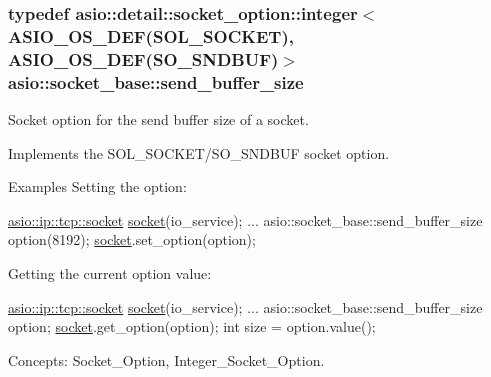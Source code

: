 \subsubsection[{send\+\_\+buffer\+\_\+size}]{\setlength{\rightskip}{0pt plus 5cm}typedef {\bf asio\+::detail\+::socket\+\_\+option\+::integer}$<$ {\bf A\+S\+I\+O\+\_\+\+O\+S\+\_\+\+D\+E\+F}(S\+O\+L\+\_\+\+S\+O\+C\+K\+E\+T), {\bf A\+S\+I\+O\+\_\+\+O\+S\+\_\+\+D\+E\+F}(S\+O\+\_\+\+S\+N\+D\+B\+U\+F)$>$ {\bf asio\+::socket\+\_\+base\+::send\+\_\+buffer\+\_\+size}}\label{classasio_1_1socket__base_a0d4a964ee76ec66ae251e903bff872e5}


Socket option for the send buffer size of a socket. 

Implements the S\+O\+L\+\_\+\+S\+O\+C\+K\+E\+T/\+S\+O\+\_\+\+S\+N\+D\+B\+U\+F socket option.

\begin{DoxyParagraph}{Examples}
Setting the option\+: 
\begin{DoxyCode}
\hyperlink{classasio_1_1basic__stream__socket}{asio::ip::tcp::socket} \hyperlink{namespacewebsocketpp_1_1transport_1_1asio_1_1socket_1_1error_a828ddaa5ed63a761e1b557465a35f05aa0c31b356014843e1d09514e794a539a7}{socket}(io\_service); 
...
asio::socket\_base::send\_buffer\_size option(8192);
\hyperlink{namespacewebsocketpp_1_1transport_1_1asio_1_1socket_1_1error_a828ddaa5ed63a761e1b557465a35f05aa0c31b356014843e1d09514e794a539a7}{socket}.set\_option(option);
\end{DoxyCode}

\end{DoxyParagraph}
\begin{DoxyParagraph}{}
Getting the current option value\+: 
\begin{DoxyCode}
\hyperlink{classasio_1_1basic__stream__socket}{asio::ip::tcp::socket} \hyperlink{namespacewebsocketpp_1_1transport_1_1asio_1_1socket_1_1error_a828ddaa5ed63a761e1b557465a35f05aa0c31b356014843e1d09514e794a539a7}{socket}(io\_service); 
...
asio::socket\_base::send\_buffer\_size option;
\hyperlink{namespacewebsocketpp_1_1transport_1_1asio_1_1socket_1_1error_a828ddaa5ed63a761e1b557465a35f05aa0c31b356014843e1d09514e794a539a7}{socket}.get\_option(option);
\textcolor{keywordtype}{int} size = option.value();
\end{DoxyCode}

\end{DoxyParagraph}
\begin{DoxyParagraph}{Concepts\+:}
Socket\+\_\+\+Option, Integer\+\_\+\+Socket\+\_\+\+Option. 
\end{DoxyParagraph}


